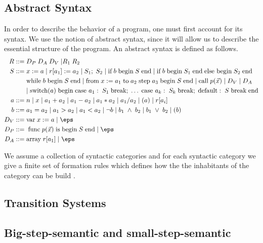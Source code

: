\subsection{Abstract Syntax}
In order to describe the behavior of a program, one must first account for its syntax. We use the notion of abstract syntax, since it will allow us to describe the essential structure of the program. An abstract syntax is defined as follows. 
\begin{align*}
R ::= \; & D_P \; D_A \; D_V \; | R_1 \; R_2 \; \\
S::= \; & x := a \; | \; r[a_1] := a_2 \; | \; S_1; \; S_2 \; | \; \text{if} \; b \; \text{begin} \; S \; \text{end} \; | \; \text{if} \; b \; \text{begin} \; S_1 \; \text{end} \; \text{else begin} \; S_2 \; \text{end} \\
~ & \text{while} \; b \; \text{begin} \; S \; \text{end} \; | \; \text{from} \; x := a_1 \; \text{to} \; a_2 \; \text{step} \; a_3 \; \text{begin} \; S \; \text{end} \; | \; \text{call} \; p(\vec{x}) \; | \; D_V \; | \; D_A \; \\
~ & | \; \text{switch}(a) \; \text{begin} \; \text{case } a_1: \; S_1 \; \text{break}; \; \dots \; \text{case } a_k: \; S_k \; \text{break}; \; \text{default}: \; S \; \text{break} \; \text{end} \\
a::= \; & n \; | \; x \; | \; a_1 + a_2 \; | \; a_1 - a_2 \; | \; a_1 * a_2 \; | \; a_1 / a_2 \; | \; (a) \; | \; r[a_i]\\
b::= \; &a_1 = a_2 \; | \; a_1 > a_2 \; | \; a_1 < a_2 \; | \; \neg b \; | \; b_1 \; \wedge \; b_2 \; | \; b_1 \; \vee \; b_2 \; | \; (b)\\
D_V::= \; & \text{var} \; x := a \;|\; \eps\\
D_P::= \; & \; \text{func} \; p(\vec{x}) \; \text{is} \; \text{begin} \; S \; \text{end}  \;|\; \eps\\
D_A::= \; & \text{array} \; r[a_1]  \;|\; \eps\\
\end{align*}

We assume a collection of syntactic categories and for each syntactic category we give a finite set of formation rules which defines how the the inhabitants of the category can be build \citep{HHTree}.

\subsection{Transition Systems}


\subsection{Big-step-semantic and small-step-semantic}

